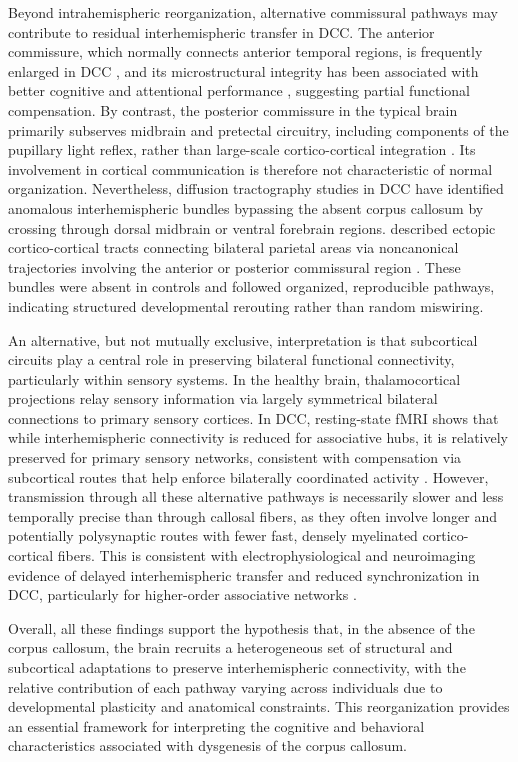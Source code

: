 \documentclass{article}
\begin{document}
Beyond intrahemispheric reorganization, alternative commissural pathways may contribute to residual interhemispheric transfer in DCC. The anterior commissure, which normally connects anterior temporal regions, is frequently enlarged in DCC \citep{Hetts2006}, and its microstructural integrity has been associated with better cognitive and attentional performance \citep{Siffredi2019}, suggesting partial functional compensation. By contrast, the posterior commissure in the typical brain primarily subserves midbrain and pretectal circuitry, including components of the pupillary light reflex, rather than large-scale cortico-cortical integration \citep{Buttner2014}. Its involvement in cortical communication is therefore not characteristic of normal organization. Nevertheless, diffusion tractography studies in DCC have identified anomalous interhemispheric bundles bypassing the absent corpus callosum by crossing through dorsal midbrain or ventral forebrain regions. \citet{Tovarmoll2014} described ectopic cortico-cortical tracts connecting bilateral parietal areas via noncanonical trajectories involving the anterior or posterior commissural region \citep{Tovarmoll2014}. These bundles were absent in controls and followed organized, reproducible pathways, indicating structured developmental rerouting rather than random miswiring.


An alternative, but not mutually exclusive, interpretation is that subcortical circuits play a central role in preserving bilateral functional connectivity, particularly within sensory systems. In the healthy brain, thalamocortical projections relay sensory information via largely symmetrical bilateral connections to primary sensory cortices. In DCC, resting-state fMRI shows that while interhemispheric connectivity is reduced for associative hubs, it is relatively preserved for primary sensory networks, consistent with compensation via subcortical routes that help enforce bilaterally coordinated activity \citep{Owen2013}. However, transmission through all these alternative pathways is necessarily slower and less temporally precise than through callosal fibers, as they often involve longer and potentially polysynaptic routes with fewer fast, densely myelinated cortico-cortical fibers. This is consistent with electrophysiological and neuroimaging evidence of delayed interhemispheric transfer and reduced synchronization in DCC, particularly for higher-order associative networks \citep{Paul2012,Hinkley2016}.

Overall, all these findings support the hypothesis that, in the absence of the corpus callosum, the brain recruits a heterogeneous set of structural and subcortical adaptations to preserve interhemispheric connectivity, with the relative contribution of each pathway varying across individuals due to developmental plasticity and anatomical constraints. This reorganization provides an essential framework for interpreting the cognitive and behavioral characteristics associated with dysgenesis of the corpus callosum.
\end{document}
